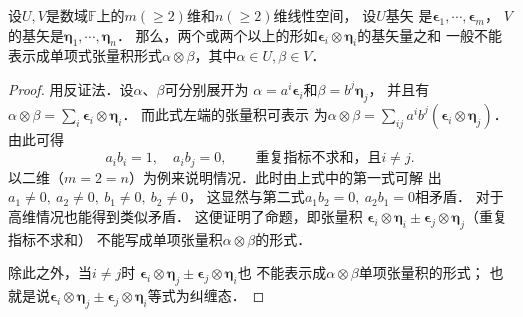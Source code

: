 \begin{proposition}
    设$U,V$是数域$\mathbb{F}$上的$m(\geqslant 2)$维和$n(\geqslant 2)$维线性空间，
    设$U$基矢
    是$\boldsymbol{\epsilon}_1, \cdots, \boldsymbol{\epsilon}_m$，
    $V$的基矢是$\boldsymbol{\eta}_1, \cdots, \boldsymbol{\eta}_n$．
    那么，两个或两个以上的形如$\boldsymbol{\epsilon}_i \otimes \boldsymbol{\eta}_i$的基矢量之和
    一般不能表示成单项式张量积形式$\alpha \otimes \beta$，其中$\alpha \in U, \beta\in V$．
\end{proposition}
\begin{proof}
    用反证法．设$\alpha$、$\beta$可分别展开为
    $\alpha =a^i \boldsymbol{\epsilon}_i$和$\beta =b^j \boldsymbol{\eta}_j$，
    并且有$\alpha\otimes \beta = \sum_{i} \boldsymbol{\epsilon}_i \otimes\boldsymbol{\eta}_i$．
    而此式左端的张量积可表示
    为$\alpha\otimes \beta = \sum_{ij} a^i b^j (\boldsymbol{\epsilon}_i \otimes\boldsymbol{\eta}_j)$．
    由此可得
    \begin{equation*}
        a_i b_i =  1, \quad a_i b_j =0, \qquad \text{重复指标不求和，且} i \neq j.
    \end{equation*}
    以二维（$m=2=n$）为例来说明情况．此时由上式中的第一式可解
    出$a_1\neq 0, \ a_2 \neq 0, \ b_1\neq 0, \ b_2 \neq 0$，
    这显然与第二式$a_1 b_2 =0,\ a_2 b_1 =0$相矛盾．
    对于高维情况也能得到类似矛盾．
    这便证明了命题，即张量积
    $\boldsymbol{\epsilon}_i \otimes \boldsymbol{\eta}_i \pm
    \boldsymbol{\epsilon}_j \otimes \boldsymbol{\eta}_j$（重复指标不求和）
    不能写成单项张量积$\alpha \otimes \beta$的形式．


    除此之外，当$i\neq j$时
    $\boldsymbol{\epsilon}_i \otimes \boldsymbol{\eta}_j \pm
    \boldsymbol{\epsilon}_j \otimes \boldsymbol{\eta}_i$也
    不能表示成$\alpha \otimes \beta$单项张量积的形式；
    也就是说$\boldsymbol{\epsilon}_i \otimes \boldsymbol{\eta}_j \pm
    \boldsymbol{\epsilon}_j \otimes \boldsymbol{\eta}_i$等式为纠缠态．
\end{proof}



